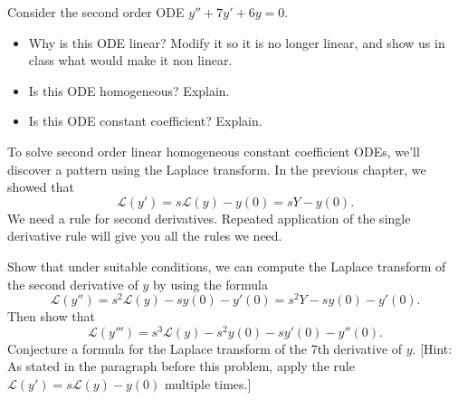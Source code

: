 \begin{problem}
 Consider the second order ODE $y''+7y'+6y=0$.  
\begin{itemize}
 \item Why is this ODE linear?  Modify it so it is no longer linear, and show us in class what would make it non linear.
 \item Is this ODE homogeneous?  Explain.
 \item Is this ODE constant coefficient? Explain.
\end{itemize}
\end{problem}




















To solve second order linear homogeneous constant coefficient ODEs, we'll discover a pattern using the Laplace transform. In the previous chapter, we showed that 
$$\mathscr{L}(y') = s\mathscr{L}(y)-y(0) = sY-y(0).$$
We need a rule for second derivatives. Repeated application of the single derivative rule will give you all the rules we need. 

\begin{problem}
 Show that under suitable conditions, we can compute the Laplace transform of the second derivative of $y$ by using the formula
 $$\mathscr{L}(y'')=s^2\mathscr{L}(y)-sy(0)-y'(0) = s^2Y-sy(0)-y'(0).$$
 Then show that 
 $$\mathscr{L}(y''')=s^3\mathscr{L}(y)-s^2y(0)-sy'(0)-y''(0).$$
 Conjecture a formula for the Laplace transform of the 7th derivative of $y$.
 [Hint: As stated in the paragraph before this problem, apply the rule $\mathscr{L}(y') = s\mathscr{L}(y)-y(0)$ multiple times.]
\end{problem}

















